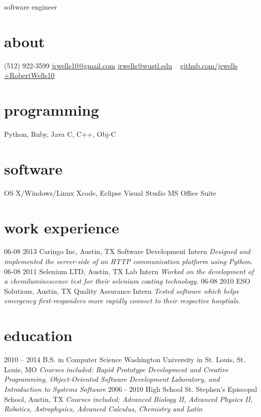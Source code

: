 \documentclass[]{cv}
\begin{document}
       {software engineer}

\begin{aside}
  \section{about}
    (512) 922-3599
    \href{mailto:jrwells10@gmail.com}{jrwells10@gmail.com}
    \href{mailto:jrwells@wustl.edu}{jrwells@wustl.edu}
    ~
    \href{http://github.com/jrwells}{github.com/jrwells}
    \href{http://google.com/+RobertWells10}{+RobertWells10}
  \section{programming}
    Python, Ruby, Java
    C, C++, Obj-C
  \section{software}
    OS X/Windows/Linux
    Xcode, Eclipse
    Visual Studio
    MS Office Suite
\end{aside}

\section{work experience}

\begin{entrylist}
  \entry
    {06-08 2013}
    {Caringo Inc, Austin, TX}
    {Software Development Intern}
    {\emph{Designed and implemented the server-side of an HTTP communication platform using Python.}}
  \entry
    {06-08 2011}
    {Selenium LTD, Austin, TX}
    {Lab Intern}
    {\emph{Worked on the development of a chemiluminescence test for their selenium coating technology.}}
  \entry
    {06-08 2010}
    {ESO Solutions, Austin, TX}
    {Quality Assurance Intern}
    {\emph{Tested software which helps emergency first-responders more rapidly connect to their respective hosptials.}}
\end{entrylist}

\section{education}

\begin{entrylist}
  \entry
    {2010 – 2014}
    {B.S. in Computer Science}
    {Washington University in St. Louis, St. Louis, MO}
    {\emph{Courses included: Rapid Prototype Development and Creative Programming, Object‐Oriented Software Development Laboratory, and Introduction to Systems Software}}
  \entry
    {2006 - 2010}
    {High School}
    {St. Stephen’s Episcopal School, Austin, TX}
    {\emph{Courses included: Advanced Biology II, Advanced Physics II, Robotics, Astrophysics, Advanced Calculus, Chemistry and Latin}}
\end{entrylist}
\end{document}
